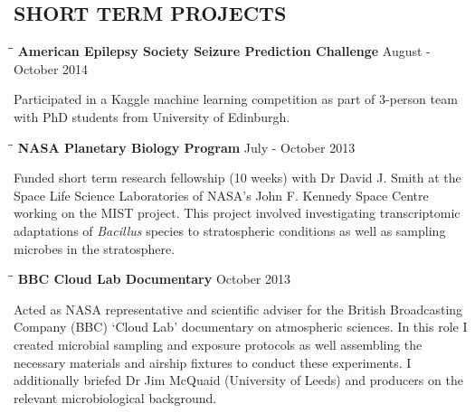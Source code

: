\documentclass{res}
\begin{document}
\begin{resume}
\section{SHORT TERM PROJECTS}

   \vspace{-0.05in} 

   \begin{tabbing}
   \hspace{2in}\= \hspace{2.6in}\= \kill 
   {\bf American Epilepsy Society Seizure Prediction Challenge} \> \>        August - October 2014\\
     \end{tabbing}\vspace{-20pt}      
     Participated in a Kaggle machine learning competition as part of 3-person team with PhD students from University of Edinburgh. 

   \vspace{-0.1in} 
   \begin{tabbing}
   \hspace{2in}\= \hspace{2.6in}\= \kill 
    {\bf NASA Planetary Biology Program} \> \>        July - October 2013\\
     \end{tabbing}\vspace{-20pt}      
     Funded short term research fellowship (10 weeks) with Dr David J. Smith at the Space Life Science Laboratories of NASA's John F. Kennedy Space Centre working on the MIST project. This project involved investigating transcriptomic adaptations of \textit{Bacillus} species to stratospheric conditions as well as sampling microbes in the stratosphere.

     \vspace{-0.1in}
   \begin{tabbing}
   \hspace{2in}\= \hspace{2.6in}\= \kill 
    {\bf BBC Cloud Lab Documentary} \> \>        October 2013\\
     \end{tabbing}\vspace{-20pt}      
     Acted as NASA representative and scientific adviser for the British Broadcasting Company (BBC) `Cloud Lab' documentary on atmospheric sciences. In this role I created microbial sampling and exposure protocols as well assembling the necessary materials and airship fixtures to conduct these experiments. I additionally briefed Dr Jim McQuaid (University of Leeds) and producers on the relevant microbiological background. 


\end{resume}
\end{document}
